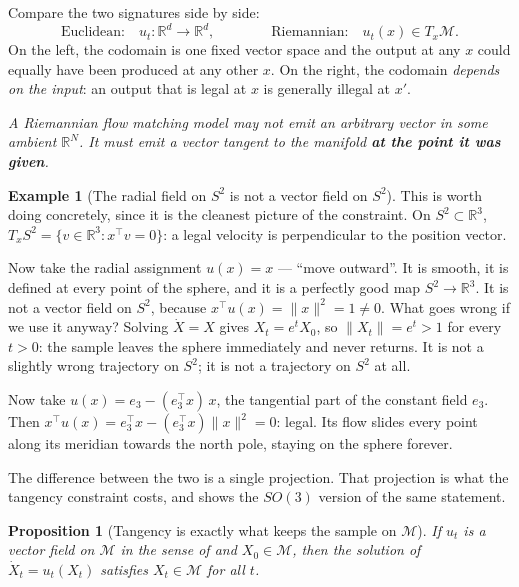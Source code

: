 \documentclass[11pt,a4paper]{report}
\newtheorem{proposition}[proposition]{Proposition}
\theoremstyle{definition}
\newtheorem{example}[example]{Example}
\theoremstyle{remark}
\newcommand{\RR}{\mathbb R}
\begin{document}
Compare the two signatures side by side:
\[
\text{Euclidean:}\quad u_t:\RR^d\to\RR^d ,
\qquad\qquad
\text{Riemannian:}\quad u_t(x)\in T_x\mathcal M .
\]
On the left, the codomain is one fixed vector space and the output at any
$x$ could equally have been produced at any other $x$. On the right, the
codomain \emph{depends on the input}: an output that is legal at $x$ is
generally illegal at $x'$.

\begin{center}
\emph{A Riemannian flow matching model may not emit an arbitrary vector in
some ambient $\RR^N$. It must emit a vector tangent to the manifold
\textbf{at the point it was given}.}
\end{center}

\begin{example}[The radial field on $S^2$ is not a vector field on $S^2$]
\label{ex:radial-not-tangent}
This is worth doing concretely, since it is the cleanest picture of the
constraint. On $S^2\subset\RR^3$, $T_xS^2=\{v\in\RR^3:x^\top v=0\}$: a
legal velocity is perpendicular to the position vector.

Now take the radial assignment $u(x)=x$ --- ``move outward''. It is smooth,
it is defined at every point of the sphere, and it is a perfectly good map
$S^2\to\RR^3$. It is not a vector field on $S^2$, because
$x^\top u(x)=\|x\|^2=1\ne0$. What goes wrong if we use it anyway? Solving
$\dot X=X$ gives $X_t=e^tX_0$, so $\|X_t\|=e^t>1$ for every $t>0$: the
sample leaves the sphere immediately and never returns. It is not a slightly
wrong trajectory on $S^2$; it is not a trajectory on $S^2$ at all.

Now take $u(x)=e_3-(e_3^\top x)\,x$, the tangential part of the constant
field $e_3$. Then $x^\top u(x)=e_3^\top x-(e_3^\top x)\|x\|^2=0$: legal.
Its flow slides every point along its meridian towards the north pole,
staying on the sphere forever.

The difference between the two is a single projection. That projection is
what the tangency constraint costs, and  shows the
$SO(3)$ version of the same statement.
\end{example}

\begin{proposition}[Tangency is exactly what keeps the sample on $\mathcal M$]
\label{prop:rfm-stays}
If $u_t$ is a vector field on $\mathcal M$ in the sense of
 and $X_0\in\mathcal M$, then the solution of
$\dot X_t=u_t(X_t)$ satisfies $X_t\in\mathcal M$ for all $t$.
\end{proposition}
\end{document}

